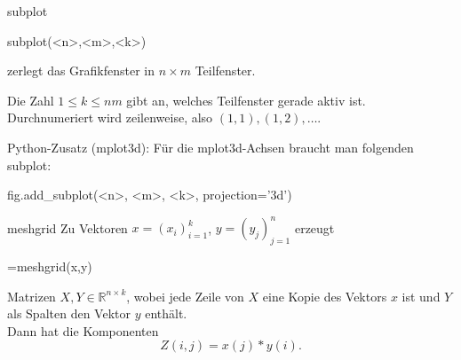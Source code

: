 \documentclass[hyperref={xetex}]{beamer}
\begin{document}
% 
% 
\begin{frame}[fragile]{subplot}
\begin{matlabin}
subplot(<n>,<m>,<k>)
\end{matlabin}
zerlegt das Grafikfenster in $n \times m$ Teilfenster. 

Die Zahl $1
\leq k \leq nm$ gibt an, welches Teilfenster gerade aktiv
ist. \\

Durchnumeriert wird zeilenweise, also $(1,1), (1,2), \dots$.

\alert{Python-Zusatz (mplot3d):} Für die mplot3d-Achsen braucht man folgenden subplot:
\begin{pyin}
fig.add_subplot(<n>, <m>, <k>, projection='3d')
\end{pyin}
\end{frame}

% 
% 
\begin{frame}[fragile]{meshgrid}
Zu Vektoren $x=(x_i)_{i=1}^k$, $y=(y_j)_{j=1}^n$ erzeugt 
\begin{matlabin}
[X,Y]=meshgrid(x,y)
\end{matlabin}
Matrizen $X,Y \in \mathbb{R}^{n \times k}$, wobei jede Zeile von $X$
eine Kopie des Vektors $x$ ist und $Y$ als Spalten den Vektor $y$
enthält. \\
Dann hat \alert{ } die Komponenten 
\[ Z(i,j)=x(j)*y(i). \]
\end{frame}

% 
% 
% 
% 
% 
% 
%
\end{document}
